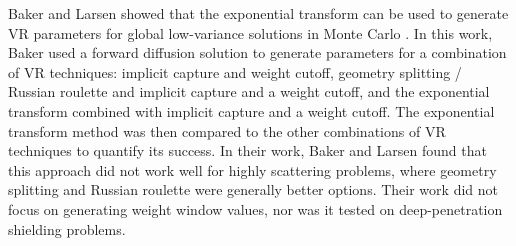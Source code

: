 Baker and Larsen showed that the exponential transform can be used to generate
VR parameters for global low-variance solutions in Monte Carlo
\cite{baker_localexponential_1993}. In this work, Baker used a forward diffusion
solution to generate parameters for a combination of VR techniques: implicit
capture and weight cutoff, geometry splitting / Russian roulette and implicit
capture and a weight cutoff, and the exponential transform combined with
implicit capture and a weight cutoff. The exponential transform method was then
compared to the other combinations of VR techniques to quantify its success.
In their work, Baker and Larsen found that
this approach did not work well for highly scattering problems, where geometry
splitting and Russian roulette were generally better options. Their work did not
focus on generating weight window values, nor was it tested on deep-penetration
shielding problems.

